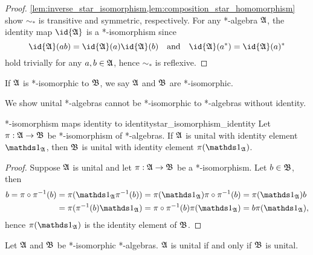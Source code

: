 \begin{proof}
    \cref{lem:inverse_star_isomorphism,lem:composition_star_homomorphism} show \(\sim_*\) is transitive and symmetric, respectively. For any *-algebra \(\mathfrak{A}\), the identity map \(\id{\algebra{A}}\) is a *-isomorphism since
    \begin{equation*}
        \id{\algebra{A}}(ab) = \id{\algebra{A}}(a) \id{\algebra{A}}(b)
        \quad\text{and}\quad
        \id{\algebra{A}}(a^*) = \id{\algebra{A}}(a)^*
    \end{equation*}
    hold trivially for any \(a, b \in \mathfrak{A}\), hence \(\sim_*\) is reflexive.
\end{proof}
\begin{remark}
    If \(\mathfrak{A}\) is *-isomorphic to \(\mathfrak{B}\), we say \(\mathfrak{A}\) and \(\mathfrak{B}\) are *-isomorphic.
\end{remark}

We show unital *-algebras cannot be *-isomorphic to *-algebras without identity.
\begin{proposition}{*-isomorphism maps identity to identity}{star_isomorphism_identity}
    Let \(\pi : \mathfrak{A} \to \mathfrak{B}\) be *-isomorphism of *-algebras. If \(\mathfrak{A}\) is unital with identity element \(\unity_{\algebra{A}}\), then \(\mathfrak{B}\) is unital with identity element \(\pi(\unity_{\algebra{A}})\).
\end{proposition}
\begin{proof}
    Suppose \(\mathfrak{A}\) is unital and let \(\pi : \mathfrak{A} \to \mathfrak{B}\) be a *-isomorphism. Let \(b \in \mathfrak{B}\), then
    \begin{align*}
        b = \pi \circ \pi^{-1}(b) &= \pi(\unity_{\algebra{A}}\pi^{-1}(b)) = \pi(\unity_{\algebra{A}})\pi\circ \pi^{-1}(b) = \pi(\unity_{\algebra{A}})b\\
                                  &= \pi(\pi^{-1}(b) \unity_{\algebra{A}}) = \pi\circ \pi^{-1}(b) \pi(\unity_{\algebra{A}}) = b\pi(\unity_\algebra{A}),
    \end{align*}
    hence \(\pi(\unity_{\algebra{A}})\) is the identity element of \(\mathfrak{B}\).
\end{proof}
\begin{corollary}
    Let \(\mathfrak{A}\) and \(\mathfrak{B}\) be *-isomorphic *-algebras. \(\mathfrak{A}\) is unital if and only if \(\mathfrak{B}\) is unital.
\end{corollary}



